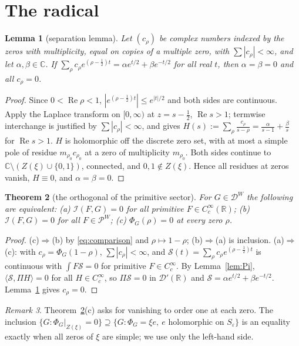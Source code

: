 \documentclass[11pt]{amsart}
\newtheorem{theorem}{Theorem}[section]
\newtheorem{lemma}[theorem]{Lemma}
\theoremstyle{definition}
\theoremstyle{remark}
\newtheorem{remark}[theorem]{Remark}
\newcommand{\C}{\mathbb C}
\newcommand{\R}{\mathbb R}
\newcommand{\Rel}{\operatorname{Re}}
\newcommand{\DW}{\mathcal D^{W}}
\newcommand{\PW}{\mathcal P^{W}}
\newcommand{\I}{\mathcal I}
\begin{document}
\section{The radical}\label{sec:radical}

\begin{lemma}[separation lemma]\label{lem:sep}
Let $(c_\rho)$ be complex numbers indexed by the zeros with multiplicity, equal on copies of a
multiple zero, with $\sum|c_\rho|<\infty$, and let $\alpha,\beta\in\C$. If
$\sum_\rho c_\rho e^{(\rho-\frac12)t}=\alpha e^{t/2}+\beta e^{-t/2}$ for all real $t$, then $\alpha=\beta=0$ and all $c_\rho=0$.
\end{lemma}
\begin{proof}
Since $0<\Rel\rho<1$, $|e^{(\rho-\frac12)t}|\le e^{|t|/2}$ and both sides are continuous. Apply the
Laplace transform on $[0,\infty)$ at $z=s-\frac12$, $\Rel s>1$; termwise interchange is justified by
$\sum|c_\rho|<\infty$, and gives $H(s):=\sum_\rho\frac{c_\rho}{s-\rho}=\frac\alpha{s-1}+\frac\beta s$ for $\Rel s>1$.
$H$ is holomorphic off the discrete zero set, with at most a simple pole of residue $m_{\rho_0}c_{\rho_0}$
at a zero of multiplicity $m_{\rho_0}$. Both sides continue to $\C\setminus(Z(\xi)\cup\{0,1\})$, connected,
and $0,1\notin Z(\xi)$. Hence all residues at zeros vanish, $H\equiv0$, and $\alpha=\beta=0$.
\end{proof}

\begin{theorem}[the orthogonal of the primitive sector]\label{thm:perp}
For $G\in\DW$ the following are equivalent: (a) $\I(F,G)=0$ for all primitive $F\in C_c^\infty(\R)$;
(b) $\I(F,G)=0$ for all $F\in\PW$; (c) $\Phi_G(\rho)=0$ at every zero $\rho$.
\end{theorem}
\begin{proof}
(c)$\Rightarrow$(b) by \eqref{eq:comparison} and $\rho\mapsto1-\rho$; (b)$\Rightarrow$(a) is inclusion.
(a)$\Rightarrow$(c): with $c_\rho=\Phi_G(1-\rho)$, $\sum|c_\rho|<\infty$, and $\mathcal S(t)=\sum_\rho c_\rho e^{(\rho-\frac12)t}$ is
continuous with $\int F\mathcal S=0$ for primitive $F\in C_c^\infty$. By Lemma~\ref{lem:Pi},
$\langle\mathcal S,\Pi H\rangle=0$ for all $H\in C_c^\infty$, so $\Pi\mathcal S=0$ in $\mathcal D'(\R)$ and
$\mathcal S=\alpha e^{t/2}+\beta e^{-t/2}$. Lemma~\ref{lem:sep} gives $c_\rho=0$.
\end{proof}

\begin{remark}
Theorem~\ref{thm:perp}(c) asks for vanishing to order one at each zero. The inclusion
$\{G:\Phi_G|_{Z(\xi)}=0\}\supseteq\{G:\Phi_G=\xi e,\ e \text{ holomorphic on } S_\varepsilon\}$ is an
equality exactly when all zeros of $\xi$ are simple; we use only the left-hand side.
\end{remark}
\end{document}
